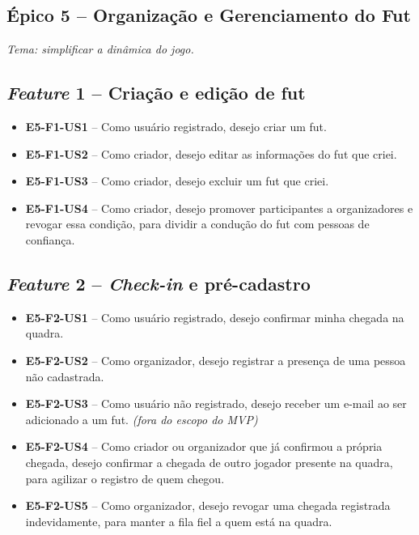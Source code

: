 \begin{apendicesenv}
    \section*{Épico 5 -- Organização e Gerenciamento do Fut}
    \textit{Tema: simplificar a dinâmica do jogo.}

    \subsection*{\textit{Feature} 1 -- Criação e edição de fut}
    \begin{itemize}
        \item \textbf{E5-F1-US1} -- Como usuário registrado, desejo criar um fut.
        \item \textbf{E5-F1-US2} -- Como criador, desejo editar as informações do fut que criei.
        \item \textbf{E5-F1-US3} -- Como criador, desejo excluir um fut que criei.
        \item \textbf{E5-F1-US4} -- Como criador, desejo promover participantes a organizadores e revogar essa condição, para dividir a condução do fut com pessoas de confiança.
    \end{itemize}

    \subsection*{\textit{Feature} 2 -- \textit{Check-in} e pré-cadastro}
    \begin{itemize}
        \item \textbf{E5-F2-US1} -- Como usuário registrado, desejo confirmar minha chegada na quadra.
        \item \textbf{E5-F2-US2} -- Como organizador, desejo registrar a presença de uma pessoa não cadastrada.
        \item \textbf{E5-F2-US3} -- Como usuário não registrado, desejo receber um e-mail ao ser adicionado a um fut. \textit{(fora do escopo do MVP)}
        \item \textbf{E5-F2-US4} -- Como criador ou organizador que já confirmou a própria chegada, desejo confirmar a chegada de outro jogador presente na quadra, para agilizar o registro de quem chegou.
        \item \textbf{E5-F2-US5} -- Como organizador, desejo revogar uma chegada registrada indevidamente, para manter a fila fiel a quem está na quadra.
    \end{itemize}


\end{apendicesenv}
